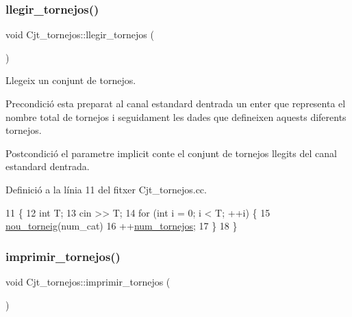 \subsubsection{\texorpdfstring{llegir\+\_\+tornejos()}{llegir\_tornejos()}}
{\footnotesize\ttfamily void Cjt\+\_\+tornejos\+::llegir\+\_\+tornejos (\begin{DoxyParamCaption}{ }\end{DoxyParamCaption})}



Llegeix un conjunt de tornejos. 

\begin{DoxyPrecond}{Precondició}
esta preparat al canal estandard d\textquotesingle{}entrada un enter que representa el nombre total de tornejos i seguidament les dades que defineixen aquests diferents tornejos. 
\end{DoxyPrecond}
\begin{DoxyPostcond}{Postcondició}
el parametre implicit conte el conjunt de tornejos llegits del canal estandard d\textquotesingle{}entrada. 
\end{DoxyPostcond}


Definició a la línia 11 del fitxer Cjt\+\_\+tornejos.\+cc.


\begin{DoxyCode}
11                                               \{
12     \textcolor{keywordtype}{int} T;
13     cin >> T;
14     \textcolor{keywordflow}{for} (\textcolor{keywordtype}{int} i = 0; i < T; ++i) \{
15         \mbox{\hyperlink{class_cjt__tornejos_ac4298fab4f5ed1d33c762dd837f50b8a}{nou\_torneig}}(num\_cat)
16         ++\mbox{\hyperlink{class_cjt__tornejos_afe968dc02bf4f83842c53c5a76182f2f}{num\_tornejos}};
17     \}
18 \}
\end{DoxyCode}
\mbox{\label{class_cjt__tornejos_a0950e966b60873b9ff216b2f8ec0c60a}} 
\subsubsection{\texorpdfstring{imprimir\+\_\+tornejos()}{imprimir\_tornejos()}}
{\footnotesize\ttfamily void Cjt\+\_\+tornejos\+::imprimir\+\_\+tornejos (\begin{DoxyParamCaption}{ }\end{DoxyParamCaption})}



